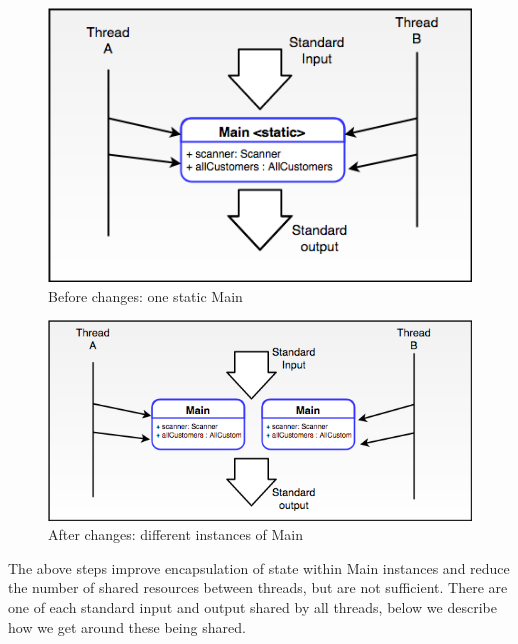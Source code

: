 \begin{minipage}[b]{0.5\textwidth}
\begin{figure}[H]
\centering
\includegraphics[scale=0.4]{res/STE-Page-1-original.png}
\caption{Before changes: one static Main}
\end{figure}
\end{minipage}
\begin{minipage}[b]{0.5\textwidth}
\begin{figure}[H]
\centering
\includegraphics[scale=0.4]{res/STE-Page-2-original.png}	
\caption{After changes: different instances of Main}
\end{figure}
\end{minipage}

The above steps improve encapsulation of state within Main instances and reduce the number of shared resources between threads, but are not sufficient. There are one of each standard input and output shared by all threads, below we describe how we get around these being shared. 

